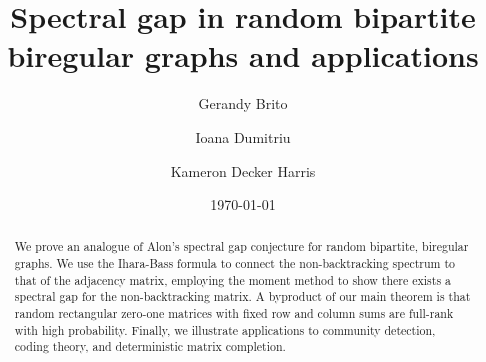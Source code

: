 \documentclass[11pt,letterpaper]{amsart}
\newcommand{\1}{\mathbf{1}}
\newcommand{\0}{\mathbf{0}} %
\newcommand{\2}{two-path}
\begin{document}
\title{Spectral gap in random bipartite biregular graphs and applications}
\author{Gerandy Brito}
\address{Georgia Institute of Technology, College of Computing}
\author{Ioana Dumitriu}
\address{University of California San Diego, Mathematics}

\author{Kameron Decker Harris}
\address{University of Washington, Paul G.\ Allen School of Computer Science \& Engineering 
and Biology}

\date{\today}


\begin{abstract}
We prove an analogue of Alon's spectral gap conjecture 
for random bipartite, biregular graphs.
We use the Ihara-Bass formula to connect the non-backtracking
spectrum to that of the adjacency matrix, 
employing the moment method to show there exists a spectral gap
for the non-backtracking matrix.
A byproduct of our main theorem is that random rectangular 
zero-one matrices with fixed row and column sums
are full-rank with high probability.
Finally, we illustrate applications to
community detection, coding theory, and
deterministic matrix completion.
\end{abstract}

\maketitle
























\end{document}
